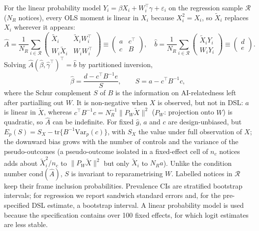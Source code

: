 \documentclass[runningheads]{llncs}
\begin{document}
For the linear probability model $Y_i=\beta X_i+W_i^\top\gamma+\varepsilon_i$ on the regression sample $\mathcal{R}$ ($N_R$ notices), every OLS moment is linear in $X_i$ because $X_i^2=X_i$, so $\tilde{X}_i$ replaces $X_i$ wherever it appears:
\begin{equation}
\hat{A}=\frac{1}{N_R}\sum_{i\in\mathcal{R}}\begin{pmatrix}\tilde{X}_i & \tilde{X}_iW_i^\top\\ W_i\tilde{X}_i & W_iW_i^\top\end{pmatrix}\equiv\begin{pmatrix}a & c^\top\\ c & B\end{pmatrix},\quad
\hat{b}=\frac{1}{N_R}\sum_{i\in\mathcal{R}}\begin{pmatrix}\tilde{X}_iY_i\\ W_iY_i\end{pmatrix}\equiv\begin{pmatrix}d\\ e\end{pmatrix}.
\label{eq:moments}
\end{equation}
Solving $\hat{A}(\hat\beta,\hat\gamma^\top)^\top=\hat{b}$ by partitioned inversion,
\begin{equation}
\hat\beta=\frac{d-c^\top B^{-1}e}{S},\qquad S=a-c^\top B^{-1}c,
\label{eq:schur}
\end{equation}
where the Schur complement $S$ of $B$ is the information on AI-relatedness left after partialling out $W$. It is non-negative when $X$ is observed, but not in DSL: $a$ is linear in $\tilde{X}$, whereas $c^\top B^{-1}c=N_R^{-1}\lVert P_W\tilde{X}\rVert^2$ ($P_W$: projection onto $W$) is quadratic, so $\hat{A}$ can be indefinite. For fixed $\hat{g}$, $a$ and $c$ are design-unbiased, but $E_p(S)=S_X-\mathrm{tr}\{B^{-1}\mathrm{Var}_p(c)\}$, with $S_X$ the value under full observation of $X$; the downward bias grows with the number of controls and the variance of the pseudo-outcomes (a pseudo-outcome isolated in a fixed-effect cell of $n_c$ notices adds about $\tilde{X}_i^2/n_c$ to $\lVert P_W\tilde{X}\rVert^2$ but only $\tilde{X}_i$ to $N_Ra$). Unlike the condition number $\mathrm{cond}(\hat{A})$, $S$ is invariant to reparametrising $W$. Labelled notices in $\mathcal{R}$ keep their frame inclusion probabilities. Prevalence CIs are stratified bootstrap intervals; for regression we report sandwich standard errors and, for the pre-specified DSL estimate, a bootstrap interval. A linear probability model is used because the specification contains over 100 fixed effects, for which logit estimates are less stable.
\end{document}
